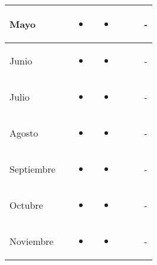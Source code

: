 \documentclass[landscape, a4paper, 10pt]{article}
\newcommand{\smallcellwidth}{0.7in}
\newcommand{\normalcellwidth}{1.2in}
\newcommand{\bigcellwidth}{2.0in}
\begin{document}
\begin{longtable}{|m{\smallcellwidth}|p{\normalcellwidth}|p{\bigcellwidth}|p{\bigcellwidth}|p{\normalcellwidth}|p{\normalcellwidth}|p{\normalcellwidth}|}
		Mayo &
		 &
		\begin{itemize}
			\item 
		\end{itemize} &
		\begin{itemize}
			\item 
		\end{itemize} &
		  &
		  &
		 - \\
		\hline
		Junio &
		 &
		\begin{itemize}
			\item 
		\end{itemize} &
		\begin{itemize}
			\item 
		\end{itemize} &
		  &
		  &
		 - \\
		\hline
		Julio &
		 &
		\begin{itemize}
			\item 
		\end{itemize} &
		\begin{itemize}
			\item 
		\end{itemize} &
		  &
		  &
		 - \\
		\hline
		Agosto &
		 &
		\begin{itemize}
			\item 
		\end{itemize} &
		\begin{itemize}
			\item 
		\end{itemize} &
		  &
		  &
		 - \\
		\hline
		Septiembre &
		 &
		\begin{itemize}
			\item 
		\end{itemize} &
		\begin{itemize}
			\item 
		\end{itemize} &
		  &
		  &
		 - \\
		\hline
		Octubre &
		 &
		\begin{itemize}
			\item 
		\end{itemize} &
		\begin{itemize}
			\item 
		\end{itemize} &
		  &
		  &
		 - \\
		\hline
		Noviembre &
		 &
		\begin{itemize}
			\item 
		\end{itemize} &
		\begin{itemize}
			\item 
		\end{itemize} &
		  &
		  &
		 - \\
		\hline

	\end{longtable}
\end{document}
